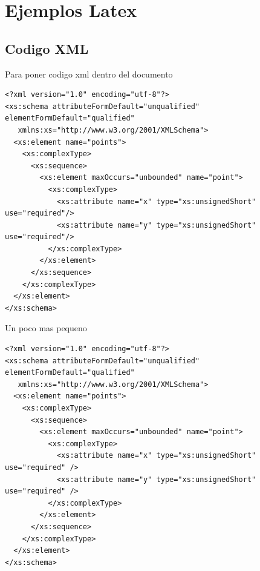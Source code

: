 
\chapter{Ejemplos Latex} %

\label{EjemplosLatex} %







\section{Codigo XML}


Para poner codigo xml dentro del documento

\begin{lstlisting}
<?xml version="1.0" encoding="utf-8"?>
<xs:schema attributeFormDefault="unqualified" elementFormDefault="qualified"
   xmlns:xs="http://www.w3.org/2001/XMLSchema">
  <xs:element name="points">
    <xs:complexType>
      <xs:sequence>
        <xs:element maxOccurs="unbounded" name="point">
          <xs:complexType>
            <xs:attribute name="x" type="xs:unsignedShort" use="required"/>
            <xs:attribute name="y" type="xs:unsignedShort" use="required"/>
          </xs:complexType>
        </xs:element>
      </xs:sequence>
    </xs:complexType>
  </xs:element>
</xs:schema>
\end{lstlisting}

Un poco mas pequeno
\begin{lstlisting}[basicstyle=\ttfamily\tiny]
<?xml version="1.0" encoding="utf-8"?>
<xs:schema attributeFormDefault="unqualified" elementFormDefault="qualified"
   xmlns:xs="http://www.w3.org/2001/XMLSchema">
  <xs:element name="points">
    <xs:complexType>
      <xs:sequence>
        <xs:element maxOccurs="unbounded" name="point">
          <xs:complexType>
            <xs:attribute name="x" type="xs:unsignedShort" use="required" />
            <xs:attribute name="y" type="xs:unsignedShort" use="required" />
          </xs:complexType>
        </xs:element>
      </xs:sequence>
    </xs:complexType>
  </xs:element>
</xs:schema>
\end{lstlisting}



